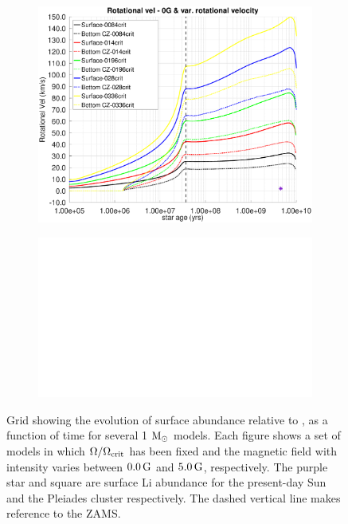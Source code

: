 \documentclass[fleqn,usenatbib]{mnras}
\begin{document}
\begin{ceqn}
\begin{figure}
\begin{subfigure}[h]{0.47\textwidth}
    \includegraphics[clip,width=\textwidth]{figures/paper1/rot_vel_var_vel_0_0g.eps}
    \label{fig:subim23}
    \end{subfigure}    
    \begin{subfigure}[h]{0.47\textwidth}
    \includegraphics[width=\textwidth]{figures/blank.eps}
    \label{fig:subim24}
    \end{subfigure}
\caption{Grid showing the evolution of surface  abundance relative to , as a function of time for several 1 $\mathrm{M}_\odot$ models. Each figure shows a set of models in which $\Omega / \Omega_{\mathrm{crit}}$ has been fixed and the magnetic field with intensity varies between $0.0\,\mathrm{G}$ and $5.0\,\mathrm{G}$, respectively. The purple star and square are surface Li abundance for the present-day Sun \citep{Asplund2009} and the Pleiades cluster \citep{Sestito2005} respectively. The dashed vertical line makes reference to the ZAMS.}
\label{fig:grid_li_var_g}
\end{figure}


\end{ceqn}
\end{document}
